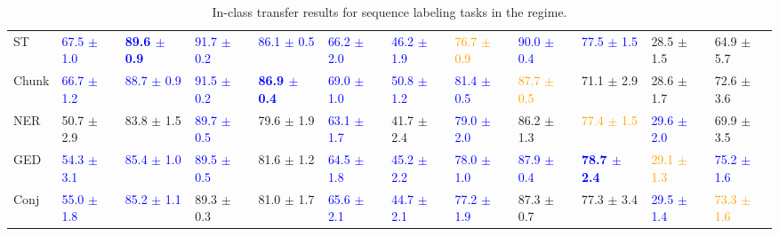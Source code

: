 \begin{landscape}
\begin{table}[t]
\begin{adjustbox}{max width=2\textwidth}
\begin{tabular}{ l l l l l  l l l l  l l l }
ST & \textcolor{blue}{67.5 $\pm$ 1.0} & \textbf{\textcolor{blue}{89.6 $\pm$ 0.9}} & \textcolor{blue}{91.7 $\pm$ 0.2} & \textcolor{blue}{86.1 $\pm$ 0.5} & \textcolor{blue}{66.2 $\pm$ 2.0} & \textcolor{blue}{46.2 $\pm$ 1.9} & \textcolor{orange}{76.7 $\pm$ 0.9} & \textcolor{blue}{90.0 $\pm$ 0.4} & \textcolor{blue}{77.5 $\pm$ 1.5} & 28.5 $\pm$ 1.5 & 64.9 $\pm$ 5.7\\
Chunk & \textcolor{blue}{66.7 $\pm$ 1.2} & \textcolor{blue}{88.7 $\pm$ 0.9} & \textcolor{blue}{91.5 $\pm$ 0.2} & \textbf{\textcolor{blue}{86.9 $\pm$ 0.4}} & \textcolor{blue}{69.0 $\pm$ 1.0} & \textcolor{blue}{50.8 $\pm$ 1.2} & \textcolor{blue}{81.4 $\pm$ 0.5} & \textcolor{orange}{87.7 $\pm$ 0.5} & 71.1 $\pm$ 2.9 & 28.6 $\pm$ 1.7 & 72.6 $\pm$ 3.6\\
NER & 50.7 $\pm$ 2.9 & 83.8 $\pm$ 1.5 & \textcolor{blue}{89.7 $\pm$ 0.5} & 79.6 $\pm$ 1.9 & \textcolor{blue}{63.1 $\pm$ 1.7} & 41.7 $\pm$ 2.4 & \textcolor{blue}{79.0 $\pm$ 2.0} & 86.2 $\pm$ 1.3 & \textcolor{orange}{77.4 $\pm$ 1.5} & \textcolor{blue}{29.6 $\pm$ 2.0} & 69.9 $\pm$ 3.5\\
GED & \textcolor{blue}{54.3 $\pm$ 3.1} & \textcolor{blue}{85.4 $\pm$ 1.0} & \textcolor{blue}{89.5 $\pm$ 0.5} & 81.6 $\pm$ 1.2 & \textcolor{blue}{64.5 $\pm$ 1.8} & \textcolor{blue}{45.2 $\pm$ 2.2} & \textcolor{blue}{78.0 $\pm$ 1.0} & \textcolor{blue}{87.9 $\pm$ 0.4} & \textbf{\textcolor{blue}{78.7 $\pm$ 2.4}} & \textcolor{orange}{29.1 $\pm$ 1.3} & \textcolor{blue}{75.2 $\pm$ 1.6}\\
Conj & \textcolor{blue}{55.0 $\pm$ 1.8} & \textcolor{blue}{85.2 $\pm$ 1.1} & 89.3 $\pm$ 0.3 & 81.0 $\pm$ 1.7 & \textcolor{blue}{65.6 $\pm$ 2.1} & \textcolor{blue}{44.7 $\pm$ 2.1} & \textcolor{blue}{77.2 $\pm$ 1.9} & 87.3 $\pm$ 0.7 & 77.3 $\pm$ 3.4 & \textcolor{blue}{29.5 $\pm$ 1.4} & \textcolor{orange}{73.3 $\pm$ 1.6}\\
\bottomrule
\end{tabular}
\end{adjustbox}
\caption{In-class transfer results for sequence labeling tasks in the  regime.}
\label{tbla6c}
\end{table}
\end{landscape}